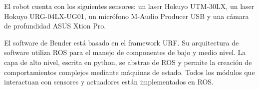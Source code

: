 El robot cuenta con los siguientes sensores: un laser Hokuyo UTM-30LX, un laser Hokuyo URG-04LX-UG01, un micr\'ofono M-Audio Producer USB y una c\'amara de profundidad ASUS Xtion Pro.

El software de Bender est\'a basado en el framework URF. Su arquitectura de software utiliza  ROS para el manejo de componentes de bajo y medio nivel. La capa de alto nivel, escrita en python, se abstrae de ROS y permite la creaci\'on de comportamientos complejos mediante m\'aquinas de estado. Todos los m\'odulos que interactuan con sensores y actuadores est\'an implementados en ROS.



%





